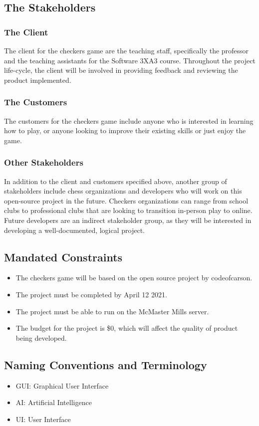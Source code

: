 \documentclass[12pt, titlepage]{article}
\begin{document}
\subsection{The Stakeholders}

\subsubsection{The Client}
The client for the checkers game are the teaching staff, specifically the professor and the teaching assistants for the Software 3XA3 course. Throughout the project life-cycle, the client will be involved in providing feedback and reviewing the product implemented. 

\subsubsection{The Customers}
The customers for the checkers game include anyone who is interested in learning how to play, or anyone looking to improve their existing skills or just enjoy the game.

\subsubsection{Other Stakeholders}
In addition to the client and customers specified above, another group of stakeholders include chess organizations and developers who will work on this open-source project in the future. Checkers organizations can range from school clubs to professional clubs that are looking to transition in-person play to online. Future developers are an indirect stakeholder group, as they will be interested in developing a well-documented, logical project.

\subsection{Mandated Constraints}
\begin{itemize}
    \item The checkers game will be based on the open source project by codeofcarson.
    \item The project must be completed by April 12 2021.
    \item The project must be able to run on the McMaster Mills server.
    \item The budget for the project is \$0, which will affect the quality of product being developed.
\end{itemize}
\subsection{Naming Conventions and Terminology}
\begin{itemize}
    \item GUI: Graphical User Interface
    \item AI: Artificial Intelligence
    \item UI: User Interface
\end{itemize}
\end{document}
